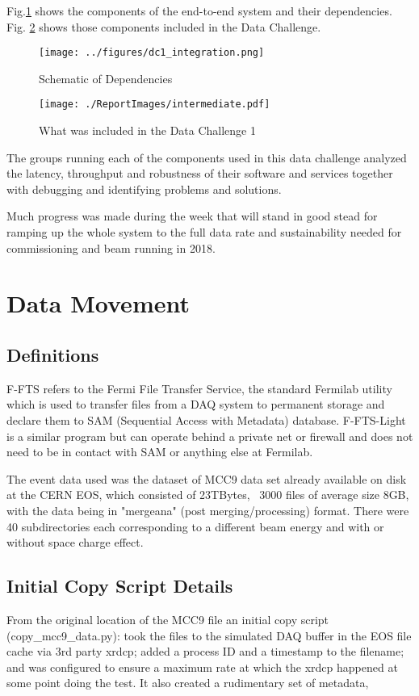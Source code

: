\documentclass[pdftex,12pt,letter]{article}
\begin{document}
 Fig.\ref{fig:dependencies} shows the components of the end-to-end system and their dependencies. Fig. \ref{fig:intermediate} shows those components included in the Data Challenge. 


\begin{figure}[tbh]
  \centering
  \texttt{[image: ../figures/dc1\_integration.png]}
  \caption{Schematic of Dependencies}
  \label{fig:dependencies}
\end{figure}


\begin{figure}[tbh]
  \centering
  \texttt{[image: ./ReportImages/intermediate.pdf]}
  \caption{What was included in the Data Challenge 1}
  \label{fig:intermediate}
\end{figure}

The groups running each of the components  used in this data challenge analyzed  the latency, throughput and robustness of their software and services together with debugging and identifying problems and solutions. 

Much progress was made during the week that  will stand in good stead for ramping up the whole system to the full data rate and sustainability needed for commissioning and beam running in 2018. 



\section {Data Movement}
\subsection {Definitions}
F-FTS refers to the Fermi File Transfer Service, the standard Fermilab utility which is used to transfer files from a DAQ system to permanent storage and declare them to SAM (Sequential Access with Metadata) database.  F-FTS-Light is a similar program but can operate behind a private net or firewall and does not need to be in contact with SAM or anything else at Fermilab.

The event data used was the dataset of MCC9 data set already available on disk at the CERN EOS, which consisted of
23TBytes,  ~3000 files of average size 8GB, with the data being in  "mergeana" (post merging/processing)  format. There were 
40 subdirectories each corresponding to a different beam energy and with or without space charge effect.

\subsection{Initial Copy Script Details}
From the original location of the MCC9 file  an initial copy script (copy\_mcc9\_data.py): took the files to the simulated DAQ buffer in the EOS file cache via 3rd party xrdcp; added a process ID and a timestamp to the filename; and was configured to ensure a maximum rate at which the xrdcp happened at some point doing the test. It also created a rudimentary set of metadata,
\end{document}

